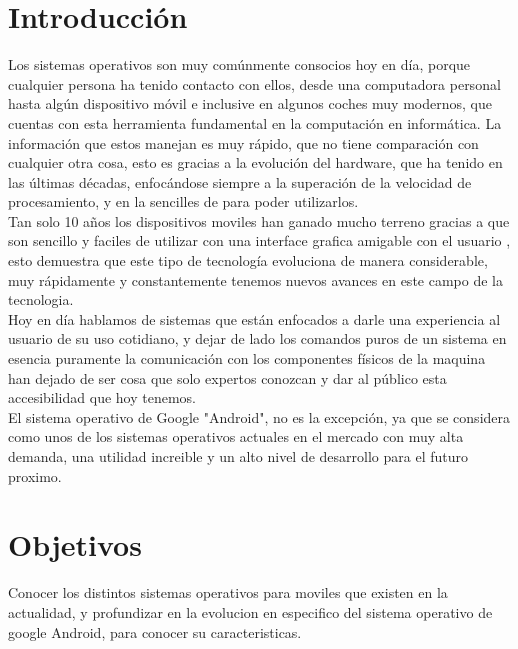 \documentclass{bmcart}
\begin{document}

\section*{Introducción}

Los sistemas operativos son muy comúnmente consocios hoy en día, porque cualquier persona ha tenido contacto con ellos, desde una computadora personal hasta algún dispositivo móvil e inclusive en algunos coches muy modernos, que cuentas con esta herramienta fundamental en la computación en informática.
La información que estos manejan es muy rápido, que no tiene comparación con cualquier otra cosa, esto es gracias a la evolución del hardware, que ha tenido en las últimas décadas, enfocándose siempre a la superación de la velocidad de procesamiento, y en la sencilles de para poder utilizarlos. \\

Tan solo 10 años los dispositivos moviles han ganado mucho terreno gracias a que son sencillo y faciles de utilizar con una interface grafica amigable con el usuario , esto demuestra que este tipo de tecnología evoluciona de manera considerable, muy rápidamente y constantemente tenemos nuevos avances en este campo de la tecnologia.\\

Hoy en día hablamos de sistemas que están enfocados a darle una experiencia al usuario de su uso cotidiano, y dejar de lado los comandos puros de un sistema en esencia puramente la comunicación con los componentes físicos de la maquina han dejado de ser cosa que solo expertos conozcan y dar al público esta accesibilidad que hoy tenemos.\\

El sistema operativo de Google "Android", no es la excepción, ya que se considera como unos de los sistemas operativos actuales en el mercado con muy alta demanda, una utilidad increible y un alto nivel de desarrollo para el futuro proximo.

\newpage


\section*{Objetivos}

Conocer los distintos sistemas operativos para moviles que existen en la actualidad, y profundizar en la evolucion en especifico del sistema operativo de google Android, para conocer su caracteristicas.\newline
\end{document}
